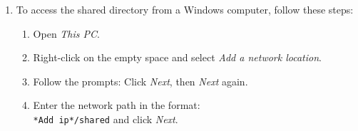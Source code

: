 \begin{enumerate}
    \item To access the shared directory from a Windows computer, follow these steps:
     \begin{enumerate}
        \item Open \textit{This PC}.
        \item Right-click on the empty space and select \textit{Add a network location}.
        \item Follow the prompts: Click \textit{Next}, then \textit{Next} again.
        \item Enter the network path in the format: \texttt{\\*Add ip*/shared} and click \textit{Next}.
      \end{enumerate}

\end{enumerate}
